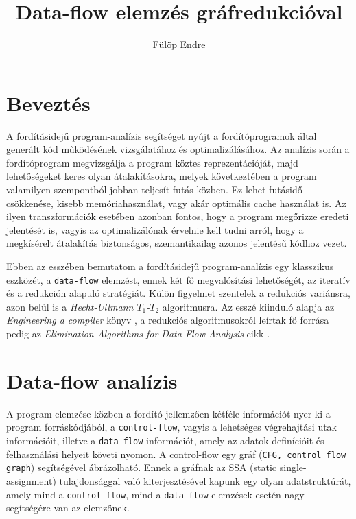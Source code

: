 \documentclass[12pt,a4paper]{article}
\author{Fülöp Endre}
\title{Data-flow elemzés gráfredukcióval}
\begin{document}
\maketitle

\section{Beveztés}
A fordításidejű program-analízis segítséget nyújt a fordítóprogramok által generált kód működésének vizsgálatához és optimalizálásához. Az analízis során a fordítóprogram megvizsgálja a program köztes reprezentációját, majd lehetőségeket keres olyan átalakításokra, melyek következtében a program valamilyen szempontból jobban teljesít futás közben. Ez lehet futásidő csökkenése, kisebb memóriahasználat, vagy akár optimális cache használat is. Az ilyen transzformációk esetében azonban fontos, hogy a program megőrizze eredeti jelentését is, vagyis az optimalizálónak érvelnie kell tudni arról, hogy a megkísérelt átalakítás biztonságos, szemantikailag azonos jelentésű kódhoz vezet.

Ebben az esszében bemutatom a fordításidejű program-analízis egy klasszikus eszközét, a \texttt{data-flow} elemzést, ennek két fő megvalósítási lehetőségét, az iteratív és a redukción alapuló stratégiát. Külön figyelmet szentelek a redukciós variánsra, azon belül is a \emph{Hecht-Ullmann $T_1$-$T_2$} algoritmusra.
Az esszé kiinduló alapja az \emph{Engineering a compiler} könyv \cite{book}, a redukciós algoritmusokról leírtak fő forrása pedig az \emph{Elimination Algorithms for Data Flow Analysis} cikk \cite{article}.

\section{Data-flow analízis}
A program elemzése közben a fordító jellemzően kétféle információt nyer ki a program forráskódjából, a \texttt{control-flow}, vagyis a lehetséges végrehajtási utak információit, illetve a \texttt{data-flow} információt, amely az adatok definícióit és felhasználási helyeit követi nyomon. A control-flow egy gráf (\texttt{CFG, control flow graph}) segítségével ábrázolható. Ennek a gráfnak az SSA (static single-assignment) tulajdonsággal való kiterjesztésével kapunk egy olyan adatstruktúrát, amely mind a \texttt{control-flow}, mind a \texttt{data-flow} elemzések esetén nagy segítségére van az elemzőnek.
\end{document}
